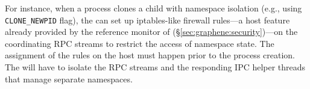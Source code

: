 For instance,
when a process clones a child with namespace isolation
(e.g., using {\tt CLONE\_NEWPID} flag),
the \libos{} can set up iptables-like firewall rules---a host feature
already provided by the reference monitor of \graphene{} (\S\ref{sec:graphene:security})---on the coordinating RPC streams
to restrict the access of namespace state.
The assignment of the rules on the host must happen
prior to the process creation.
The \libos{} will have to isolate the RPC streams and the responding IPC helper threads that manage separate namespaces.







